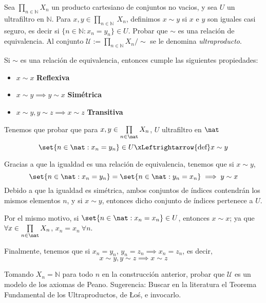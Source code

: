 \begin{problem}
Sea  $\prod_{n\in \mathbb{N}} X_n$ un producto cartesiano de conjuntos no vacios, y sea $U$ un ultrafiltro en $\mathbb{N}$.
Para $x,y \in  \prod_{n\in \mathbb{N}}\ X_n$, definimos $x\sim y$ si $x$ e $y$ son iguales casi seguro, es
decir si $\{n\in \mathbb{N}: x_n = y_n\}\in U$. Probar que $\sim$ es una relación de equivalencia.
Al conjunto $\mathcal{U}:=\prod_{n\in \mathbb{N}} X_n/\sim$ se le denomina {\em ultraproducto}.

\solution

Si $\sim$ es una relación de equivalencia, entonces cumple las siguientes propiedades:
\begin{itemize}
	\item $x \sim x$ {\bf Reflexiva}
	\item $x \sim y \implies y \sim x$ {\bf Simétrica}
	\item $x \sim y, y \sim z \implies x \sim z$ {\bf Transitiva}
\end{itemize}

Tenemos que probar que para $x,y \in \prod\limits_{n \in \nat} X_n$, $U$ ultrafiltro en $\nat$
\[ \set{ n \in \nat : x_n = y_n} \in U \xLeftrightarrow{\text{def}} x \sim y \]

Gracias a que la igualdad es una relación de equivalencia, tenemos que si $x \sim y$,
\[\set{ n \in \nat : x_n = y_n} = \set{ n \in \nat : y_n = x_n} \implies y \sim x \]
Debido a que la igualdad es simétrica, ambos conjuntos de índices contendrán los mismos elementos $n$, y si $x\sim y$, entonces dicho conjunto de índices pertenece a $U$.

Por el mismo motivo, si $\set{ n \in \nat : x_n = x_n} \in U$, entonces $x \sim x$; ya que\\
$\forall x \in \prod\limits_{n \in \nat} X_n$, $x_n = x_n \ \forall n$.

Finalmente, tenemos que si $x_n = y_n$, $y_n = z_n \implies x_n = z_n$, es decir,
\[x \sim y, y \sim z \implies x \sim z\]

\end{problem}

\begin{problem}
Tomando $X_n = \mathbb{N}$ para todo $n$ en la construcción anterior, probar que $\mathcal{U}$ es un modelo de los axiomas de Peano. Sugerencia: Buscar en la literatura el Teorema Fundamental de los Ultraproductos, de {\L}o\'s, e invocarlo.

\solution

\end{problem}

